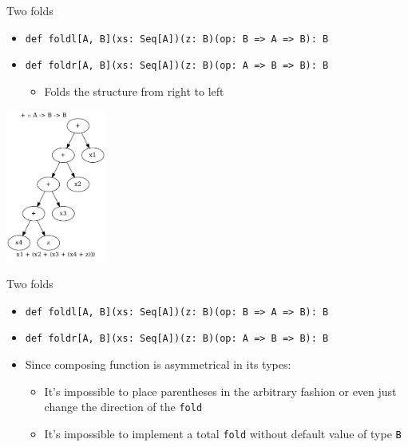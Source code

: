 \documentclass[presentation,aspectratio=169,smaller]{beamer}
\begin{document}
\begin{frame}[label={sec:orgfa76141},fragile]{Two folds}
 \begin{itemize}
\item \texttt{def foldl[A, B](xs: Seq[A])(z: B)(op: B => A => B): B}
\item \texttt{def foldr[A, B](xs: Seq[A])(z: B)(op: A => B => B): B}
\begin{itemize}
\item Folds the structure from right to left
\end{itemize}
\end{itemize}

\pause

\begin{center}
\includegraphics[height=5cm]{.dot/foldr-1.png}
\end{center}
\end{frame}

\begin{frame}[label={sec:org18a94fd},fragile]{Two folds}
 \begin{itemize}
\item \texttt{def foldl[A, B](xs: Seq[A])(z: B)(op: B => A => B): B}
\item \texttt{def foldr[A, B](xs: Seq[A])(z: B)(op: A => B => B): B}
\item Since composing function is asymmetrical in its types:
\begin{itemize}
\item It’s impossible to place parentheses in the arbitrary fashion or even just
change the direction of the \texttt{fold}
\item It’s impossible to implement a total \texttt{fold} without default value of type \texttt{B}
\end{itemize}
\end{itemize}
\end{frame}
\end{document}
